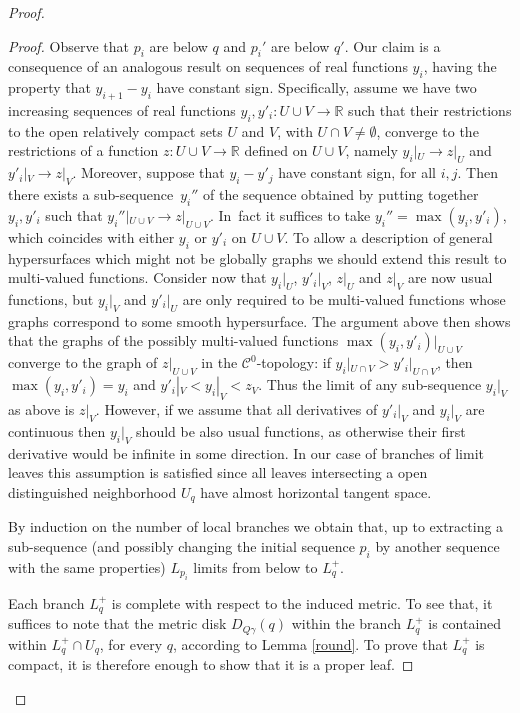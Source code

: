 \documentclass[JEP,XML,SOM,Unicode]{cedram}
\let\mathcal\mathscr
\theoremstyle{definition}
\theoremstyle{remark}
\numberwithin{equation}{section}
\newcommand{\RR}{\mathbb R}
\begin{document}
\begin{proof}
\begin{proof}
Observe that $p_i$ are below $q$ and $p_i'$ are below $q'$.
Our claim is a consequence of an analogous result on sequences of real functions $y_i$,
having the property that $y_{i+1}-y_i$ have constant sign.
Specifically, assume we have two increasing
sequences of real functions $y_i,y'_i:U\cup V\to \RR$ such that their restrictions to the
open relatively compact sets $U$ and $V$,
with $U\cap V\neq\emptyset$, converge to the restrictions of a function
$z:U\cup V\to \RR$ defined on $U\cup V$, namely
${y_i}|_U\to z|_U$ and ${y'_i}|_V\to z|_V$. Moreover, suppose that
$y_i-y'_j$ have constant sign, for all $i,j$. Then there exists a sub-sequence~$y_i''$ of the sequence obtained by putting together $y_i, y'_i$
such that ${y_i''}|_{U\cup V}\to z|_{U\cup V}$. In~fact it suffices to take
$y_i''=\max(y_i,y'_i)$, which coincides with either $y_i$ or $y'_i$ on $U\cup V$.
To allow a description of general hypersurfaces which might not be globally graphs we should
extend this result to multi-valued functions. Consider now that
${y_i}|_U$, ${y'_i}|_V$, $z|_U$ and $z|_V$ are now usual functions, but ${y_i}|_V$ and ${y'_i}|_U$
are only required to be multi-valued functions whose graphs correspond to some smooth hypersurface.
The argument above then shows that the graphs of the possibly multi-valued functions
$\max(y_i,y'_i)|_{U\cup V}$ converge to the graph of $z|_{U\cup V}$ in the ${\mathcal C}^0$-topology:
if ${y_i}|_{U\cap V} > {y'_i}|_{U\cap V}$, then $\max(y_i,y'_i)=y_i$ and
${y'_i}|_V < {y_i}|_V < z_V$. Thus the limit of any sub-sequence ${y_i}|_V$ as above is $z|_V$.
However, if we assume that all derivatives of ${y'_i}|_V$ and ${y_i}|_V$ are continuous
then ${y_i}|_V$ should be also usual functions, as otherwise their first derivative would be infinite
in some direction. In our case of branches of limit leaves this assumption is satisfied since
all leaves intersecting a open distinguished neighborhood $U_q$ have almost horizontal tangent space.

By induction on the number of local branches
we obtain that, up to extracting a sub-sequence (and possibly changing the initial
sequence $p_i$ by another sequence with the same properties) $L_{p_i}$ limits from below to $L_q^+$.

Each branch $L_q^+$ is complete with respect to the induced metric. To see that, it suffices
to note that the metric disk $D_{Q\gamma}(q)$ within the branch
$L_q^+$ is contained within $L^+_{q}\cap U_{q}$, for every $q$,
according to Lemma \ref{round}.
To prove that $L_q^+$ is compact, it is therefore enough to show that it is a proper leaf.


\end{proof}
\end{proof}
\end{document}
